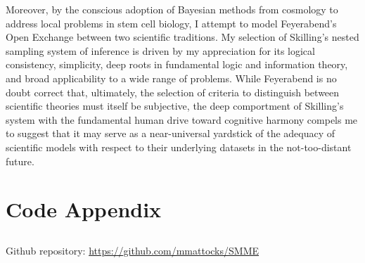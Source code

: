 \documentclass{ut-thesis}
\begin{document}
\begin{NoHyper}
Moreover, by the conscious adoption of Bayesian methods from cosmology to address local problems in stem cell biology, I attempt to model Feyerabend's Open Exchange between two scientific traditions. My selection of Skilling's nested sampling system of inference is driven by my appreciation for its logical consistency, simplicity, deep roots in fundamental logic and information theory, and broad applicability to a wide range of problems. While Feyerabend is no doubt correct that, ultimately, the selection of criteria to distinguish between scientific theories must itself be subjective, the deep comportment of Skilling's system with the fundamental human drive toward cognitive harmony \cite{Rescher2005} compels me to suggest that it may serve as a near-universal yardstick of the adequacy of scientific models with respect to their underlying datasets in the not-too-distant future.
\chapter{Code Appendix}
\label{chap:code}
\setmonofont[Contextuals={Alternate}]{Fira Code}

\section{\protect{}}
Github repository: \url{https://github.com/mmattocks/SMME}
\label{SMMEcode}
\subsection{\protect{}}
\inputminted[breaklines, mathescape, linenos,   numbersep=5pt, frame=lines, framesep=2mm]{python}{/srv/git/SMME/setup_project.py}
\subsection{\protect{}}
\inputminted[breaklines, mathescape, linenos,   numbersep=5pt, frame=lines, framesep=2mm]{cpp}{/srv/git/SMME/apps/src/BoijeSimulator.cpp}
\subsection{\protect{}}
\inputminted[breaklines, mathescape, linenos,   numbersep=5pt, frame=lines, framesep=2mm]{cpp}{/srv/git/SMME/apps/src/GomesSimulator.cpp}
\subsection{\protect{}}
\inputminted[breaklines, mathescape, linenos,   numbersep=5pt, frame=lines, framesep=2mm]{cpp}{/srv/git/SMME/apps/src/HeSimulator.cpp}

\end{NoHyper}
\end{document}
